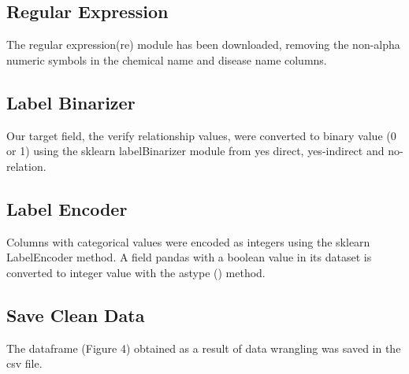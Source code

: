 \documentclass[onecolumn]{article}
\begin{document}
\subsection{Regular Expression}
The regular expression(re) module has been downloaded, removing the non-alpha numeric symbols in the chemical name and disease name columns.
\begin{figure}[h!t]
\centering
{}
\caption{\label{fig:demo}
}
\end{figure}






\subsection{Label Binarizer}
Our target field, the verify relationship values, were converted to binary value (0 or 1) using the sklearn labelBinarizer module from yes direct, yes-indirect and no-relation.
\subsection{Label Encoder}
Columns with categorical values were encoded as integers using the sklearn LabelEncoder method. A field pandas with a boolean value in its dataset is converted to integer value with the astype () method.
\subsection{Save Clean Data}
The dataframe (Figure 4) obtained as a result of data wrangling was saved in the csv file.
\end{document}
